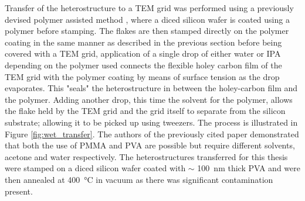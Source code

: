 Transfer of the heterostructure to a TEM grid was performed using a previously devised polymer assisted method \cite{kosterPolymerassistedTEMSpecimen2021}, where a diced silicon wafer is coated using a polymer before stamping.
The flakes are then stamped directly on the polymer coating in the same manner as described in the previous section before being covered with a TEM grid, application of a single drop of either water or IPA  depending on the polymer used connects the flexible holey carbon film of the TEM grid with the polymer coating by means of surface tension as the drop evaporates. This "seals" the heterostructure in between the holey-carbon film and the polymer.
Adding another drop, this time the solvent for the polymer, allows the flake held by the TEM grid and the grid itself to separate from the silicon substrate; allowing it to be picked up using tweezers.
The process is illustrated in Figure \ref{fig:wet_transfer}.
The authors of the previously cited paper demonstrated that both the use of PMMA and PVA are possible but require different solvents, acetone and water respectively.
The heterostructures transferred for this thesis were stamped on a diced silicon wafer coated with \(\sim \) \SI{100}{\nm} thick PVA and were then annealed at \SI{400}{\degreeCelsius} in vacuum as there was significant contamination present.

